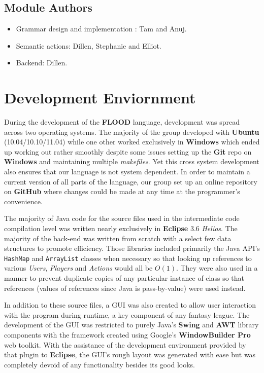 \documentclass[12pt]{report}
\begin{document}
\section{Module Authors}
\begin{singlespace}
\begin{itemize}
\item Grammar design and implementation : Tam and Anuj.
\item Semantic actions: Dillen, Stephanie and Elliot.
\item Backend: Dillen.
\end{itemize}
\end{singlespace}

\chapter{Development Enviornment}

During the development of the \textbf{FLOOD} language, development was spread across two operating systems. The majority of the group developed with \textbf{Ubuntu} (10.04/10.10/11.04) while one other worked exclusively in \textbf{Windows} which ended up working out rather smoothly despite some issues setting up the \textbf{Git} repo on \textbf{Windows} and maintaining multiple \textit{makefiles}. Yet this cross system development also ensures that our language is not system dependent. In order to maintain a current version of all parts of the language, our group set up an online repository on \textbf{GitHub} where changes could be made at any time at the programmer's convenience.

The majority of Java code for the source files used in the intermediate code compilation level was written nearly exclusively in \textbf{Eclipse} 3.6 \textit{Helios}. The majority of the back-end was written from scratch with a select few data structures to promote efficiency. Those libraries included primarily the Java API's \texttt{HashMap} and \texttt{ArrayList} classes when necessary so that looking up references to various \textit{Users}, \textit{Players} and \textit{Actions} would all be $O(1)$. They were also used in a manner to prevent duplicate copies of any particular instance of class so that references (values of references since Java is pass-by-value) were used instead.

In addition to these source files, a GUI was also created to allow user interaction with the program during runtime, a key component of any fantasy league. The development of the GUI was restricted to purely Java's \textbf{Swing} and \textbf{AWT} library components with the framework created using Google's \textbf{WindowBuilder Pro} web toolkit. With the assistance of the development environment provided by that plugin to \textbf{Eclipse}, the GUI's rough layout was generated with ease but was completely devoid of any functionality besides its good looks.
\end{document}

